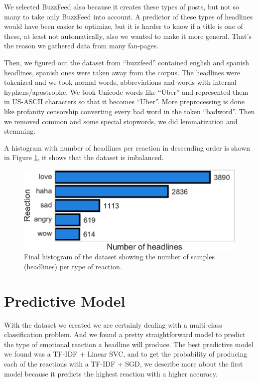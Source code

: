\documentclass[10pt]{article}
\begin{document}
We selected BuzzFeed also because it creates these types of posts, but not so many to take only BuzzFeed into account. A predictor of these types of headlines would have been easier to optimize, but it is harder to know if a title is one of these, at least not automatically, also we wanted to make it more general. That's the reason we gathered data from many fan-pages.

Then, we figured out the dataset from ``buzzfeed'' contained english and spanish headlines, spanish ones were taken away from the corpus. The headlines were tokenized and we took normal words, abbreviations and words with internal hyphens/apostrophe. We took Unicode words like ``Über'' and represented them in US-ASCII characters so that it becomes ``Uber''. More preprocessing is done like profanity censorship converting every bad word in the token ``badword''. Then we removed common and some special stopwords, we did lemmatization and stemming.

A histogram with number of headlines per reaction in descending order is shown in Figure \ref{fig:hist}, it shows that the dataset is imbalanced.

\begin{figure}[ht!]
\centering
\includegraphics[width=1.0\columnwidth]{../3_notebooks/notebook_figures/histogram_reactions.pdf}
\caption{Final histogram of the dataset showing the number of samples (headlines) per type of reaction.}
\label{fig:hist}
\end{figure}


\section{Predictive Model} 

With the dataset we created we are certainly dealing with a multi-class classification problem. And we found a pretty straightforward model to predict the type of emotional reaction a headline will produce. The best predictive model we found was a TF-IDF + Linear SVC, and to get the probability of producing each of the reactions with a TF-IDF + SGD, we describe more about the first model because it predicts the highest reaction with a higher accuracy.
\end{document}
